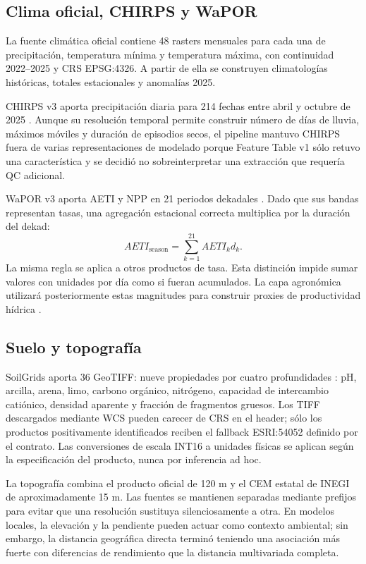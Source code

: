 \subsection{Clima oficial, CHIRPS y WaPOR}

La fuente climática oficial contiene 48 rasters mensuales para cada una de precipitación,
temperatura mínima y temperatura máxima, con continuidad 2022--2025 y CRS EPSG:4326. A partir
de ella se construyen climatologías históricas, totales estacionales y anomalías 2025.

CHIRPS v3 aporta precipitación diaria para 214 fechas entre abril y octubre de 2025 \citep{Funk2015CHIRPS}. Aunque su
resolución temporal permite construir número de días de lluvia, máximos móviles y duración de
episodios secos, el pipeline mantuvo CHIRPS fuera de varias representaciones de modelado porque
Feature Table v1 sólo retuvo una característica y se decidió no sobreinterpretar una
extracción que requería QC adicional.

WaPOR v3 aporta AETI y NPP en 21 periodos dekadales \citep{FAOWaPOR}. Dado que sus bandas representan tasas,
una agregación estacional correcta multiplica por la duración del dekad:
\begin{equation}
AETI_{\mathrm{season}}
=
\sum_{k=1}^{21} AETI_k d_k.
\label{eq:wapor-duration}
\end{equation}
La misma regla se aplica a otros productos de tasa. Esta distinción impide sumar valores con
unidades por día como si fueran acumulados. La capa agronómica utilizará posteriormente estas
magnitudes para construir proxies de productividad hídrica \citep{Dhonthi2024}.

\subsection{Suelo y topografía}

SoilGrids aporta 36 GeoTIFF: nueve propiedades por cuatro profundidades \citep{Poggio2021SoilGrids}:
pH, arcilla, arena, limo, carbono orgánico, nitrógeno, capacidad de intercambio catiónico,
densidad aparente y fracción de fragmentos gruesos. Los TIFF descargados mediante WCS pueden
carecer de CRS en el header; sólo los productos positivamente identificados reciben el
fallback ESRI:54052 definido por el contrato. Las conversiones de escala INT16 a unidades
físicas se aplican según la especificación del producto, nunca por inferencia ad hoc.

La topografía combina el producto oficial de 120 m y el CEM estatal de INEGI \citep{INEGICEM} de
aproximadamente 15 m. Las fuentes se mantienen separadas mediante prefijos para evitar que una
resolución sustituya silenciosamente a otra. En modelos locales, la elevación y la pendiente
pueden actuar como contexto ambiental; sin embargo, la distancia geográfica directa terminó
teniendo una asociación más fuerte con diferencias de rendimiento que la distancia
multivariada completa.

